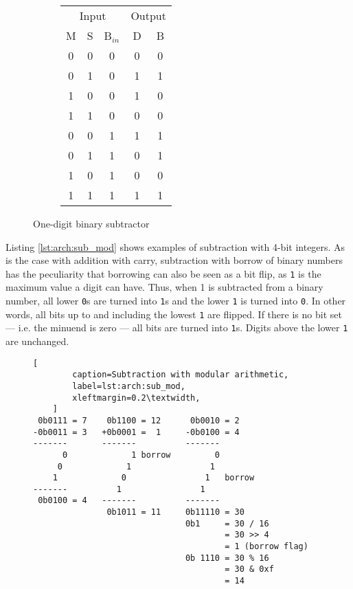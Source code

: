\begin{figure}[ht]
    \centering
    \begin{subfigure}[h]{0.3\textwidth}
        \begin{tabular}{ccc|cc}
            \multicolumn{3}{c|}{Input} &
            \multicolumn{2}{c}{Output} \\
            M & S & B$_{in}$ & D & B \\
            \hline
            0 & 0 & 0 & 0 & 0 \\
            0 & 1 & 0 & 1 & 1 \\
            1 & 0 & 0 & 1 & 0 \\
            1 & 1 & 0 & 0 & 0 \\
            \hline
            0 & 0 & 1 & 1 & 1 \\
            0 & 1 & 1 & 0 & 1 \\
            1 & 0 & 1 & 0 & 0 \\
            1 & 1 & 1 & 1 & 1 \\
        \end{tabular}
    \end{subfigure}
    \begin{subfigure}[h]{0.65\textwidth}
        
    \end{subfigure}
    \caption{One-digit binary subtractor}
    \label{fig:arch:subtractor}
\end{figure}

Listing \ref{lst:arch:sub_mod} shows examples of subtraction with 4-bit
integers.  As is the case with addition with carry, subtraction with borrow of
binary numbers has the peculiarity that borrowing can also be seen as a bit
flip, as \texttt{1} is the maximum value a digit can have.  Thus, when 1 is
subtracted from a binary number, all lower \texttt{0}s are turned into
\texttt{1}s and the lower \texttt{1} is turned into \texttt{0}.  In other words,
all bits up to and including the lowest \texttt{1} are flipped.  If there is no
bit set --- i.e.  the minuend is zero --- all bits are turned into
\texttt{1}s\footnotemark.  Digits above the lower \texttt{1} are unchanged.

\begin{figure}[ht]
    \begin{lstlisting}[
        caption=Subtraction with modular arithmetic,
        label=lst:arch:sub_mod,
        xleftmargin=0.2\textwidth,
    ]
 0b0111 = 7    0b1100 = 12      0b0010 = 2
-0b0011 = 3   +0b0001 =  1     -0b0100 = 4
-------       -------          -------
      0             1 borrow         0
     0             1                1
    1             0                1   borrow
-------          1                1
 0b0100 = 4   -------          -------
               0b1011 = 11     0b11110 = 30
                               0b1     = 30 / 16
                                       = 30 >> 4
                                       = 1 (borrow flag)
                               0b 1110 = 30 % 16
                                       = 30 & 0xf
                                       = 14
    \end{lstlisting}
\end{figure}

